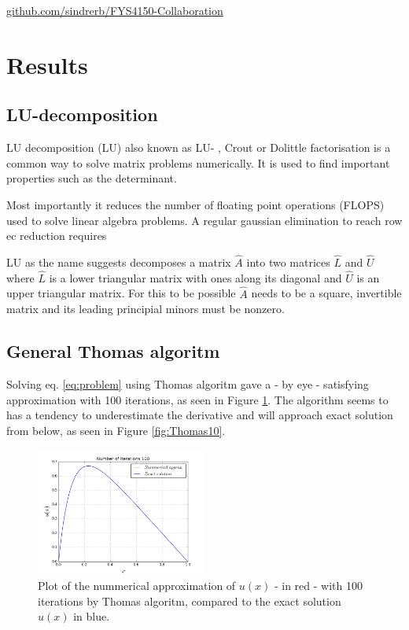 \documentclass[twoside,twocolumn]{article}
\newcommand{\nl}{

\medskip
\noindent
}
\begin{document}
\begin{center}
 \href{https://github.com/sindrerb/FYS4150-Collaboration}{github.com/sindrerb/FYS4150-Collaboration}
\end{center}

\section{Results}
\subsection{LU-decomposition}
LU decomposition (LU) also known as LU- , Crout or Dolittle factorisation \cite{linalg:lay}\cite{compfys} is a common way to solve matrix problems numerically. It is used to find important properties such as the determinant.
\nl
Most importantly it reduces the number of floating point operations (FLOPS) used to solve linear algebra problems.
A regular gaussian elimination to reach row ec reduction requires 
\nl
LU as the name suggests decomposes a matrix $\hat{A}$ into  two matrices $\hat{L}$ and $\hat{U}$ where $\hat{L}$ is a lower triangular matrix with ones along its diagonal and $\hat{U}$ is an upper triangular matrix. For this to be possible $\hat{A}$ needs to be a square, invertible matrix and its leading principial minors must be nonzero.

\subsection{General Thomas algoritm}
Solving eq. \ref{eq:problem} using Thomas algoritm gave a - by eye - satisfying approximation with 100 iterations, as seen in Figure \ref{fig:Thomas1E2}. The algorithm seems to has a tendency to underestimate the derivative and will approach exact solution from below, as seen in Figure \ref{fig:Thomas10}.

\begin{figure}[htp]
\includegraphics[width=0.5\textwidth]{figures/b-run1e2.png} 
\caption{Plot of the nummerical approximation of $u(x)$ - in red - with 100 iterations by Thomas algoritm, compared to the exact solution $u(x)$ in blue.} \label{fig:Thomas1E2}
\end{figure}
\end{document}
